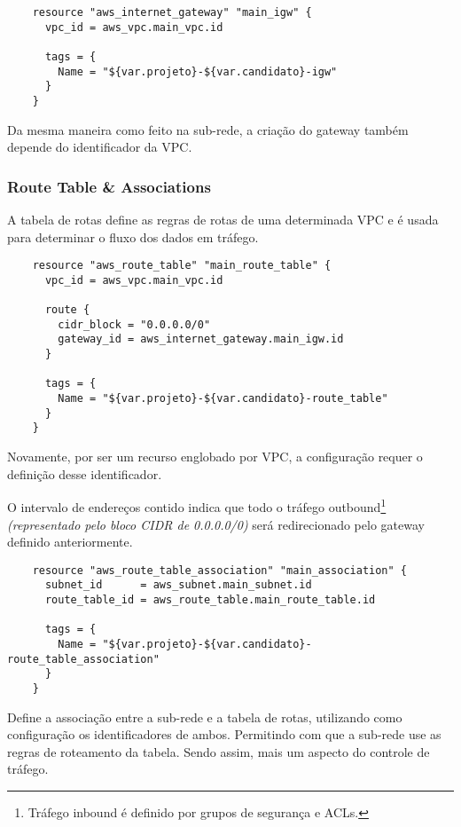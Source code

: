 \documentclass{article}
\begin{document}
\begin{verbatim}
    resource "aws_internet_gateway" "main_igw" {
      vpc_id = aws_vpc.main_vpc.id

      tags = {
        Name = "${var.projeto}-${var.candidato}-igw"
      }
    }
\end{verbatim}

Da mesma maneira como feito na sub-rede, a criação do gateway também depende do identificador da VPC.

\subsubsection{Route Table \& Associations}
A tabela de rotas define as regras de rotas de uma determinada VPC e é usada para determinar o fluxo dos dados em tráfego.

\begin{verbatim}
    resource "aws_route_table" "main_route_table" {
      vpc_id = aws_vpc.main_vpc.id

      route {
        cidr_block = "0.0.0.0/0"
        gateway_id = aws_internet_gateway.main_igw.id
      }

      tags = {
        Name = "${var.projeto}-${var.candidato}-route_table"
      }
    }
\end{verbatim}

Novamente, por ser um recurso englobado por VPC, a configuração requer o definição desse identificador.

O intervalo de endereços contido indica que todo o tráfego outbound\footnote{
    Tráfego inbound é definido por grupos de segurança e ACLs.
} \textit{(representado pelo bloco CIDR de 0.0.0.0/0)} será redirecionado pelo gateway definido anteriormente. 

\begin{verbatim}
    resource "aws_route_table_association" "main_association" {
      subnet_id      = aws_subnet.main_subnet.id
      route_table_id = aws_route_table.main_route_table.id

      tags = {
        Name = "${var.projeto}-${var.candidato}-route_table_association"
      }
    }
\end{verbatim}

Define a associação entre a sub-rede e a tabela de rotas, utilizando como configuração os identificadores de ambos. Permitindo com que a sub-rede use as regras de roteamento da tabela. Sendo assim, mais um aspecto do controle de tráfego.
\end{document}
